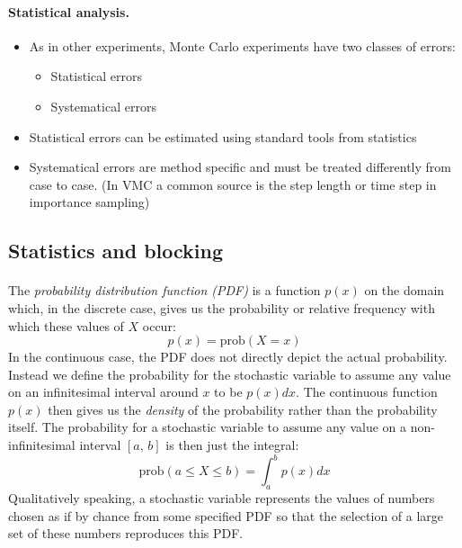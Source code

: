 \documentclass[%
twoside,                 %
final,                   %
10pt]{article}
\begin{document}
\paragraph{Statistical analysis.}
\begin{itemize}
    \item As in other experiments, Monte Carlo experiments have two classes of errors:
\begin{itemize}

      \item Statistical errors

      \item Systematical errors

\end{itemize}

\noindent
    \item Statistical errors can be estimated using standard tools from statistics

    \item Systematical errors are method specific and must be treated differently from case to case. (In VMC a common source is the step length or time step in importance sampling)
\end{itemize}

\noindent

    

\subsection{Statistics and blocking}

\paragraph{}
The \emph{probability distribution function (PDF)} is a function
$p(x)$ on the domain which, in the discrete case, gives us the
probability or relative frequency with which these values of $X$ occur:
\[
p(x) = \mathrm{prob}(X=x)
\]
In the continuous case, the PDF does not directly depict the
actual probability. Instead we define the probability for the
stochastic variable to assume any value on an infinitesimal interval
around $x$ to be $p(x)dx$. The continuous function $p(x)$ then gives us
the \emph{density} of the probability rather than the probability
itself. The probability for a stochastic variable to assume any value
on a non-infinitesimal interval $[a,\,b]$ is then just the integral:
\[
\mathrm{prob}(a\leq X\leq b) = \int_a^b p(x)dx
\]
Qualitatively speaking, a stochastic variable represents the values of
numbers chosen as if by chance from some specified PDF so that the
selection of a large set of these numbers reproduces this PDF.
\end{document}
